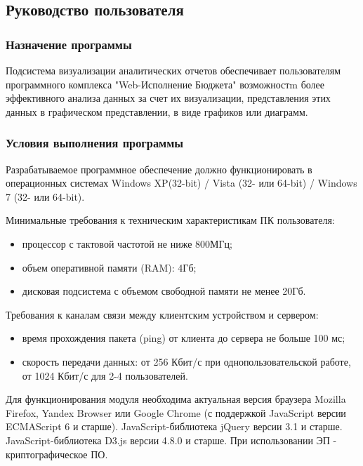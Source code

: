 \documentclass[a4paper]{extarticle}
\numberwithin{equation}{section}
\begin{document}
\subsection{Руководство пользователя}

\subsubsection{Назначение программы}
Подсистема визуализации аналитических отчетов обеспечивает пользователям программного комплекса "Web-Исполнение Бюджета" возможностm более эффективного анализа данных за счет их визуализации, представления этих данных в графическом представлении, в виде графиков или диаграмм.

\subsubsection{Условия выполнения программы}
Разрабатываемое программное обеспечение должно функционировать в операционных системах Windows XP(32-bit) / Vista (32- или 64-bit) / Windows 7 (32- или 64-bit).\par
Минимальные требования к техническим характеристикам ПК пользователя:\par
\begin{itemize}
  \item процессор с тактовой частотой не ниже 800МГц;
  \item объем оперативной памяти (RAM): 4Гб;
  \item дисковая подсистема с объемом свободной памяти не менее 20Гб.
\end{itemize}\par
Требования к каналам связи между клиентским устройством и сервером:\par
\begin{itemize}
  \item время прохождения пакета (ping) от клиента до сервера не больше 100 мс;
  \item скорость передачи данных: от 256 Кбит/с при однопользовательской работе, от 1024 Кбит/с для 2-4 пользователей.
\end{itemize}\par
Для функционирования модуля необходима актуальная версия браузера Mozilla Firefox, Yandex Browser или Google Chrome (с поддержкой JavaScript версии ECMAScript 6 и старше). JavaScript-библиотека jQuery версии 3.1 и старше. JavaScript-библиотека D3.js версии 4.8.0 и старше. При использовании ЭП - криптографическое ПО.
\end{document}
